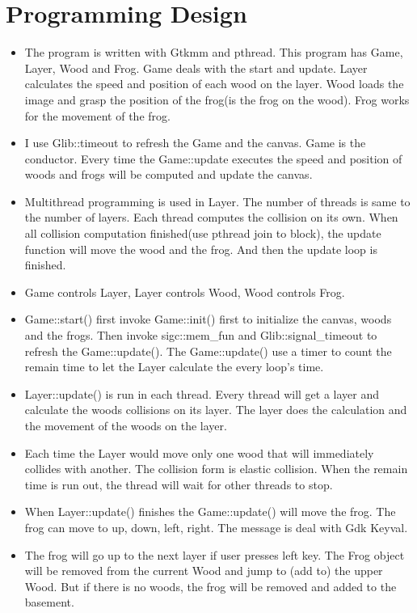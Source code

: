 \documentclass{article}
\begin{document}
\section{Programming Design}
	\begin{itemize}
	\large
		\item
			The program is written with Gtkmm and pthread. This program has
			Game, Layer, Wood and Frog. Game deals with the start and update.
			Layer calculates the speed and position of each wood on the layer.
			Wood loads the image and grasp the position of the frog(is the
			frog on the wood). Frog works for the movement of the frog.
		\item
			I use Glib::timeout to refresh the Game and the canvas. Game is
			the conductor. Every time the Game::update executes the speed and
			position of woods and frogs will be computed and update the canvas.
		\item
			Multithread programming is used in Layer. The number of threads
			is same to the number of layers. Each thread computes the collision
			on its own. When all collision computation finished(use
			pthread join to block), the update function will move the wood
			and the frog. And then the update loop is finished.
		\item
			Game controls Layer, Layer controls Wood, Wood controls Frog.
		\item
			Game::start() first invoke Game::init() first to initialize the canvas,  woods
			and the frogs. Then invoke sigc::mem_fun and Glib::signal_timeout
			to refresh the Game::update(). The Game::update() use a timer to
			count the remain time to let the Layer calculate the every loop's
			time.
		\item
			Layer::update() is run in each thread. Every thread will get a
			layer and calculate the woods collisions on its layer. The layer
			does the calculation and the movement of the woods on the layer.
		\item
			Each time the Layer would move only one wood that will immediately
			collides with another. The collision form is elastic collision.
			When the remain time is run out, the thread will wait for other
			threads to stop.
		\item
			When Layer::update() finishes the Game::update() will move the frog.
			The frog can move to up, down, left, right. The message is deal with
			Gdk Keyval.
		\item
			The frog will go up to the next layer if user presses left key.
			The Frog object will be removed from the current Wood and jump to
			(add to) the upper Wood. But if there is no woods, the frog will be
			removed and added to the basement.

	\end{itemize}
\end{document}
